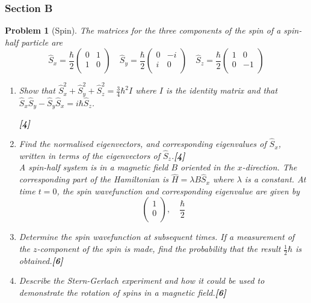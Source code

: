 \documentclass[a4paper]{article}
\theoremstyle{new}
\newtheorem{qns}{Problem}[subsection]
\begin{document}
\subsubsection{Section B}
\begin{qns}[Spin]
The matrices for the three components of the spin of a spin-half particle are
$$\hat{S}_x=\frac{\hbar}{2}\begin{pmatrix}0&1\\1&0\\\end{pmatrix}\quad\hat{S}_y=\frac{\hbar}{2}\begin{pmatrix}0&-i\\i&0\\\end{pmatrix}\quad\hat{S}_z=\frac{\hbar}{2}\begin{pmatrix}1&0\\0&-1\\\end{pmatrix}$$
\begin{enumerate}[label=(\alph*)]
\item Show that $\hat{S}_x^2+\hat{S}_y^2+\hat{S}_z^2=\frac{3}{4}\hbar^2I$ where $I$ is the identity matrix and that $\hat{S}_x\hat{S}_y-\hat{S}_y\hat{S}_x=i\hbar\hat{S}_z$.

\hfill\textbf{[4]}
\item Find the normalised eigenvectors, and corresponding eigenvalues of $\hat{S}_x$, written in terms of the eigenvectors of $\hat{S}_z$.\hfill\textbf{[4]}\\[5pt]
A spin-half system is in a magnetic field $B$ oriented in the $x$-direction. The corresponding part of the Hamiltonian is $\hat{H}=\lambda B\hat{S}_x$ where $\lambda$ is a constant. At time $t = 0$, the spin wavefunction and corresponding eigenvalue are given by
$$\begin{pmatrix}1\\0\\\end{pmatrix},\quad\frac{\hbar}{2}$$
\item Determine the spin wavefunction at subsequent times. If a measurement of the $z$-component of the spin is made, find the probability that the result $\frac{1}{2}\hbar$ is obtained.\hfill\textbf{[6]}
\item Describe the Stern-Gerlach experiment and how it could be used to demonstrate the rotation of spins in a magnetic field.\hfill\textbf{[6]}
\end{enumerate}
\end{qns}
\end{document}

